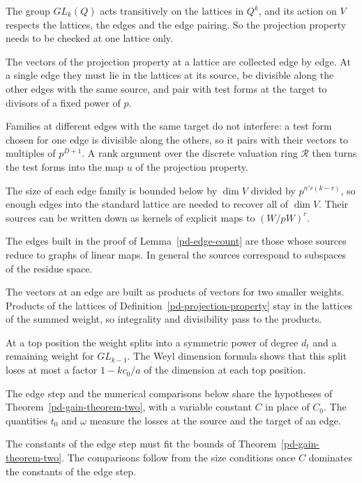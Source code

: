 The group $GL_k(Q)$ acts transitively on the lattices in $Q^k$, and its action on $V$ respects the
lattices, the edges and the edge pairing. So the projection property needs to be checked at one
lattice only.

The vectors of the projection property at a lattice are collected edge by edge. At a single edge they
must lie in the lattices at its source, be divisible along the other edges with the same source, and
pair with test forms at the target to divisors of a fixed power of $p$.

Families at different edges with the same target do not interfere: a test form chosen for one edge is
divisible along the others, so it pairs with their vectors to multiples of $p^{D+1}$. A rank argument
over the discrete valuation ring $\mathcal R$ then turns the test forms into the map $u$ of the
projection property.

The size of each edge family is bounded below by $\dim V$ divided by $p^{n'r(k-r)}$, so enough edges
into the standard lattice are needed to recover all of $\dim V$. Their sources can be written down as
kernels of explicit maps to $(W/pW)^r$.

The edges built in the proof of Lemma~\ref{pd-edge-count} are those whose sources reduce to graphs of
linear maps. In general the sources correspond to subspaces of the residue space.

The vectors at an edge are built as products of vectors for two smaller weights. Products of the
lattices of Definition~\ref{pd-projection-property} stay in the lattices of the summed weight, so
integrality and divisibility pass to the products.

At a top position the weight splits into a symmetric power of degree $d_t$ and a remaining weight for
$GL_{k-1}$. The Weyl dimension formula shows that this split loses at most a factor
$1-kc_0/a$ of the dimension at each top position.

The edge step and the numerical comparisons below share the hypotheses of
Theorem~\ref{pd-gain-theorem-two}, with a variable constant $C$ in place of $C_0$. The quantities
$t_0$ and $\omega$ measure the losses at the source and the target of an edge.

The constants of the edge step must fit the bounds of Theorem~\ref{pd-gain-theorem-two}. The
comparisons follow from the size conditions once $C$ dominates the constants of the edge step.

